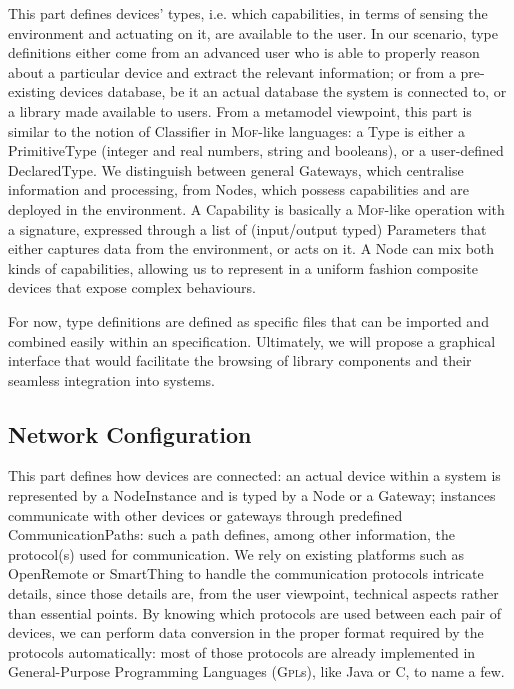 This part defines \IOT devices' types, i.e. which capabilities, in terms of sensing the environment and actuating on it, are available to the user. In our scenario, type definitions either come from an advanced user who is able to properly reason about a particular device and extract the relevant information; or from a pre-existing devices database, be it an actual database the system is connected to, or a library made available to users. From a metamodel viewpoint, this part is similar to the notion of \textsf{Classifier} in \textsc{Mof}-like languages: a \textsf{Type} is either a \textsf{PrimitiveType} (integer and real numbers, string and booleans), or a user-defined \textsf{DeclaredType}. We distinguish between general \textsf{Gateway}s, which centralise information and processing, from \textsf{Node}s, which possess capabilities and are deployed in the environment. A \textsf{Capability} is basically a \textsc{Mof}-like operation with a signature, expressed through a list of (input/output typed) \textsf{Parameter}s that either captures data from the environment, or acts on it. A \textsf{Node} can mix both kinds of capabilities, allowing us to represent in a uniform fashion composite devices that expose complex behaviours.
	
For now, type definitions are defined as specific files that can be imported and combined easily within an \IOT specification. Ultimately, we will propose a graphical interface that would facilitate the browsing of library components and their seamless integration into \IOT systems.
	
\subsection{Network Configuration}
\label{sec:IoTDSL-NetworkConfiguration}

This part defines how devices are connected: an actual device within a system is represented by a \textsf{NodeInstance} and is typed by a \textsf{Node} or a \textsf{Gateway}; instances communicate with other \IOT devices or gateways through predefined \textsf{CommunicationPath}s: such a path defines, among other information, the protocol(s) used for communication. We rely on existing platforms such as OpenRemote or SmartThing to handle the communication protocols intricate details, since those details are, from the user viewpoint, technical aspects rather than essential points. By knowing which protocols are used between each pair of devices, we can perform data conversion in the proper format required by the protocols automatically: most of those protocols are already implemented in General-Purpose Programming Languages (\textsc{Gpl}s), like Java or C, to name a few.
	
